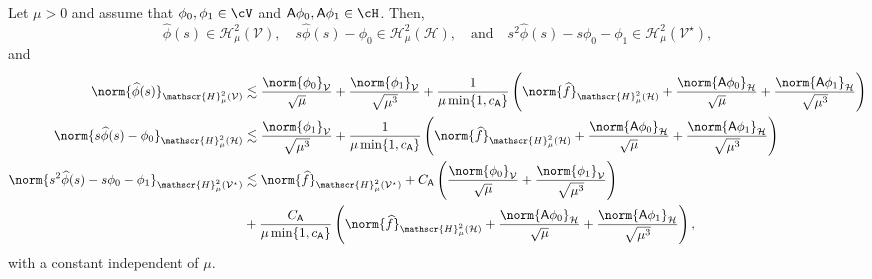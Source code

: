 \begin{corollary}\label{cor:hardy_uniqueness_time}
Let $\mu>0$ and assume that $\phi_0,\phi_1\in\cV$ and $\mathsf{A}\phi_0, \mathsf{A}\phi_1\in\cH$. Then, 
\begin{equation}
    \widehat{\phi}(s) \in \mathscr{H}^2_\mu(\mathcal{V}),
    \quad
    s\widehat{\phi}(s) - \phi_0\in \mathscr{H}^2_\mu(\mathcal{H}),
    \quad
    \text{and}
    \quad
    s^2\widehat{\phi}(s) - s\phi_0 -\phi_1\in \mathscr{H}^2_\mu(\mathcal{V}^\star),
\end{equation}
and
\begin{equation}
\begin{aligned}
    \norm{\widehat{\phi}(s)}_{ \mathscr{H}^2_\mu(\mathcal{V})}
    &
    \lesssim
   	\frac{\norm{\phi_0}_{\mathcal{V}}}{\sqrt{\mu}}
	+
	\frac{\norm{\phi_1}_{\mathcal{V}}}{\sqrt{\mu^3}}
	+
	\frac{
		1
	}{
		\mu\min\{1, c_{\mathsf{A}}\}
	}
	\left(
		\norm{\widehat{f}}_{\mathscr{H}^2_\mu(\mathcal{H})}
		+
		\frac{\norm{\mathsf{A}\phi_0}_{\mathcal{H}}}{\sqrt{\mu}}
		+
		\frac{\norm{\mathsf{A}\phi_1}_{\mathcal{H}}}{\sqrt{\mu^3}}
	\right)
    \\
    \norm{s\widehat{\phi}(s) -\phi_0}_{\mathscr{H}^2_\mu(\mathcal{H})}
    &
    \lesssim
   	\frac{\norm{\phi_1}_{\mathcal{V}}}{\sqrt{\mu^3}}
	+
	\frac{
		1
	}{
		\mu \min\{1, c_{\mathsf{A}}\}
	}
	\left(
		\norm{\widehat{f}}_{\mathscr{H}^2_\mu(\mathcal{H})}
		+
		\frac{\norm{\mathsf{A}\phi_0}_{\mathcal{H}}}{\sqrt{\mu}}
		+
		\frac{\norm{\mathsf{A}\phi_1}_{\mathcal{H}}}{\sqrt{\mu^3}}
	\right)
    \\
    \norm{s^2\widehat{\phi}(s) - s\phi_0 -\phi_1}_{\mathscr{H}^2_\mu(\mathcal{V}^\star)}
    &
    \lesssim
   	\norm{\widehat{f}}_{{\mathscr{H}^2_\mu(\mathcal{V}^\star)}}
	+ 
	C_{\mathsf{A}}
	\left(
   		\frac{\norm{\phi_0}_{\mathcal{V}}}{\sqrt{\mu}}
		+
		\frac{\norm{\phi_1}_{\mathcal{V}}}{\sqrt{\mu^3}}
	\right)
	\\
	&
	+
	\frac{C_{\mathsf{A}}}{{\mu}\min\{1, c_{\mathsf{A}}\}}
	\left(
		\norm{\widehat{f}}_{{\mathscr{H}^2_\mu(\mathcal{H})}} 
		+ 
		\frac{\norm{\mathsf{A}\phi_0}_{\mathcal{H}}}{\sqrt{\mu}}
		+
		\frac{\norm{\mathsf{A}\phi_1}_{\mathcal{H}}}{\sqrt{\mu^3}}
	\right),
\end{aligned}
\end{equation}
with a constant independent of $\mu$.


\end{corollary}
